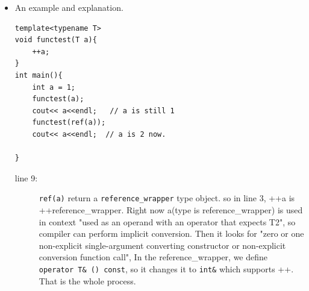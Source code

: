 \documentclass[a4paper,11pt,twoside]{book}
\begin{document}
\begin{itemize}
	\item An example and explanation.
\begin{lstlisting}[]
template<typename T>
void functest(T a){
	++a;
}
int main(){
	int a = 1;
	functest(a);
	cout<< a<<endl;   // a is still 1
	functest(ref(a));
	cout<< a<<endl;  // a is 2 now. 
	
}
\end{lstlisting}	
	\begin{description}
		\item[line 9:] \texttt{ref(a)} return a \texttt{reference\_wrapper} type object. so in line 3, ++a is ++reference\_wrapper. Right now a(type is reference\_wrapper) is used in context "used as an operand with an operator that expects T2", so compiler can perform implicit conversion. Then it looks for "zero or one non-explicit single-argument converting constructor or non-explicit conversion function call", In the reference\_wrapper, we define \texttt{operator T\& () const}, so it changes it to \texttt{int\&} which supports ++. That is the whole process. 
	\end{description}	
	
\end{itemize}
\end{document}
